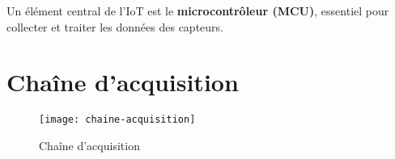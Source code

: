 Un élément central de l'IoT est le \textbf{microcontrôleur (MCU)}, essentiel pour collecter et traiter les données des capteurs.


\section{Chaîne d'acquisition}

\begin{figure}[!ht]
  \centering
  \texttt{[image: chaine-acquisition]}
  \caption{Chaîne d'acquisition}
  \label{fig:chain_acquisition}
\end{figure}